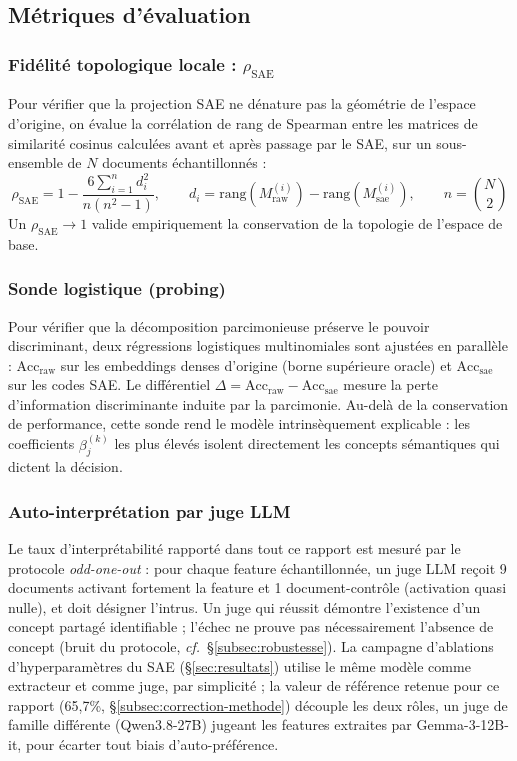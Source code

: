 \documentclass[11pt]{article}
\begin{document}
\subsection{Métriques d'évaluation}

\subsubsection{Fidélité topologique locale : \texorpdfstring{$\rho_\text{SAE}$}{rho\_SAE}}
Pour vérifier que la projection SAE ne dénature pas la géométrie de l'espace
d'origine, on évalue la corrélation de rang de Spearman entre les matrices de
similarité cosinus calculées avant et après passage par le SAE, sur un
sous-ensemble de $N$ documents échantillonnés :
\[
  \rho_\text{SAE} = 1 - \frac{6\sum_{i=1}^n d_i^2}{n(n^2-1)}, \qquad
  d_i = \text{rang}(M_\text{raw}^{(i)}) - \text{rang}(M_\text{sae}^{(i)}), \qquad
  n = \binom{N}{2}
\]
Un $\rho_\text{SAE} \to 1$ valide empiriquement la conservation de la
topologie de l'espace de base.

\subsubsection{Sonde logistique (probing)}
Pour vérifier que la décomposition parcimonieuse préserve le pouvoir
discriminant, deux régressions logistiques multinomiales sont ajustées en
parallèle : $\text{Acc}_\text{raw}$ sur les embeddings denses d'origine
(borne supérieure oracle) et $\text{Acc}_\text{sae}$ sur les codes SAE. Le
différentiel $\Delta = \text{Acc}_\text{raw} - \text{Acc}_\text{sae}$ mesure
la perte d'information discriminante induite par la parcimonie. Au-delà de la
conservation de performance, cette sonde rend le modèle intrinsèquement
explicable : les coefficients $\beta_j^{(k)}$ les plus élevés isolent
directement les concepts sémantiques qui dictent la décision.

\subsubsection{Auto-interprétation par juge LLM}
Le taux d'interprétabilité rapporté dans tout ce rapport est mesuré par le
protocole \emph{odd-one-out} \cite{karvonen2025saebench} : pour chaque feature échantillonnée, un juge LLM
reçoit 9 documents activant fortement la feature et 1 document-contrôle
(activation quasi nulle), et doit désigner l'intrus. Un juge qui réussit
démontre l'existence d'un concept partagé identifiable ; l'échec ne prouve pas
nécessairement l'absence de concept (bruit du protocole,
\emph{cf.}~\S\ref{subsec:robustesse}). La campagne d'ablations
d'hyperparamètres du SAE (\S\ref{sec:resultats}) utilise le même modèle comme
extracteur et comme juge, par simplicité ; la valeur de référence retenue
pour ce rapport (65,7\%, \S\ref{subsec:correction-methode}) découple les deux
rôles, un juge de famille différente (Qwen3.8-27B) jugeant les features
extraites par Gemma-3-12B-it, pour écarter tout biais d'auto-préférence.
\end{document}
